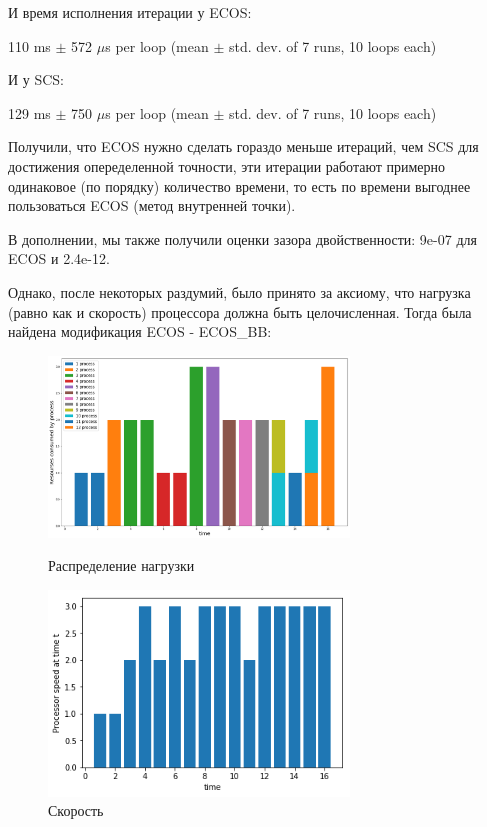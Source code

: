 \documentclass{article}
\begin{document}
И время исполнения итерации у ECOS: 

110 ms $\pm$ 572 $\mu$s per loop (mean $\pm$ std. dev. of 7 runs, 10 loops each)

И у SCS:

129 ms $\pm$ 750 $\mu$s per loop (mean $\pm$ std. dev. of 7 runs, 10 loops each)

Получили, что ECOS нужно сделать гораздо меньше итераций, чем SCS для достижения опеределенной точности, эти итерации работают примерно одинаковое (по порядку) количество времени, то есть по времени выгоднее пользоваться ECOS (метод внутренней точки).

В дополнении, мы также получили оценки зазора двойственности: 9e-07 для ECOS и 2.4e-12.

Однако, после некоторых раздумий, было принято за аксиому, что нагрузка (равно как и скорость) процессора должна быть целочисленная. Тогда была найдена модификация ECOS - ECOS\_BB:


\begin{figure}[h]
\begin{center}
\begin{minipage}[h]{8cm}
\includegraphics[width=8cm]{ECOSBB_2.png}
\caption{Распределение нагрузки} %
\label{ris:experimoriginal} %
\end{minipage}
\hfill 
\begin{minipage}[h]{8cm}
\includegraphics[width=8cm]{ECOSBB_3.png}
\caption{Скорость}
\label{ris:experimcoded}
\end{minipage}
\end{center}
\end{figure}
\end{document}
